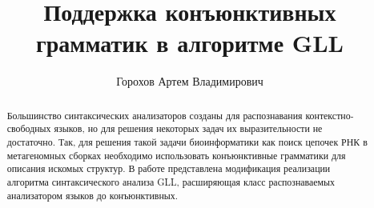 \title{Поддержка конъюнктивных грамматик в алгоритме GLL}


\author{Горохов Артем Владимирович}



\maketitle             

\begin{abstract}
Большинство синтаксических анализаторов созданы для распознавания контекстно-свободных языков,
но для решения некоторых задач их выразительности не достаточно. 
Так, для решения такой задачи биоинформатики как поиск цепочек РНК в метагеномных сборках необходимо 
использовать конъюнктивные грамматики для описания искомых структур. 
В работе представлена модификация реализации алгоритма синтаксического 
анализа GLL, расширяющая класс распознаваемых анализатором языков до конъюнктивных. 
\end{abstract}








